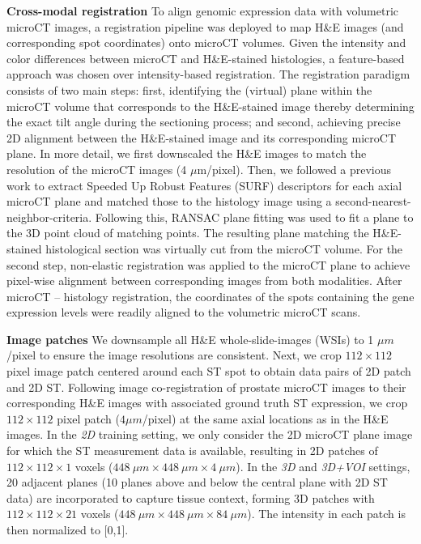 \noindent\textbf{Cross-modal registration} To align genomic expression data with volumetric microCT images, a registration pipeline was deployed to map H\&E images (and corresponding spot coordinates) onto microCT volumes. Given the intensity and color differences between microCT and H\&E-stained histologies, a feature-based approach was chosen over intensity-based registration. The registration paradigm consists of two main steps: first, identifying the (virtual) plane within the microCT volume that corresponds to the H\&E-stained image thereby determining the exact tilt angle during the sectioning process; and second, achieving precise 2D alignment between the H\&E-stained image and its corresponding microCT plane. In more detail, we first downscaled the H\&E images to match the resolution of the microCT images (4 $\mu$m/pixel). Then,
we followed a previous work\cite{chicherova2014histology} to extract Speeded Up Robust Features (SURF) descriptors \cite{bay2006surf} for each axial microCT plane and matched those to the histology image using a second-nearest-neighbor-criteria. Following this, RANSAC plane fitting \cite{fischler1981random, dong2022deciphering} was used to fit a plane to the 3D point cloud of matching points. The resulting plane matching the H\&E-stained histological section was virtually cut from the microCT volume. For the second step, non-elastic registration\cite{gatenbee2023virtual} was applied to the microCT plane to achieve pixel-wise alignment between corresponding images from both modalities. After microCT – histology registration, the coordinates of the spots containing the gene expression levels were readily aligned to the volumetric microCT scans.
 
\noindent\textbf{Image patches} We downsample all H\&E whole-slide-images (WSIs) to 1 $\mu m$/pixel to ensure the image resolutions are consistent. Next, we crop $112\times112$ pixel image patch centered around each ST spot to obtain data pairs of 2D patch and 2D ST. 
Following image co-registration of prostate microCT images to their corresponding H\&E images with associated ground truth ST expression, we crop $112\times 112$ pixel patch ($4 \mu m$/pixel) at the same axial locations as in the H\&E images. In the \textit{2D} training setting, we only consider the 2D microCT plane image for which the ST measurement data is available, resulting in 2D patches of $112\times 112\times 1$ voxels ($448~\mu m \times 448~\mu m \times 4~\mu m $). In the \textit{3D} and \textit{3D+VOI} settings, 20 adjacent planes (10 planes above and below the central plane with 2D ST data) are incorporated to capture tissue context, forming 3D patches with $112\times 112\times 21$ voxels ($448~\mu m \times 448~\mu m \times 84~\mu m$). The intensity in each patch is then normalized to [0,1].  

